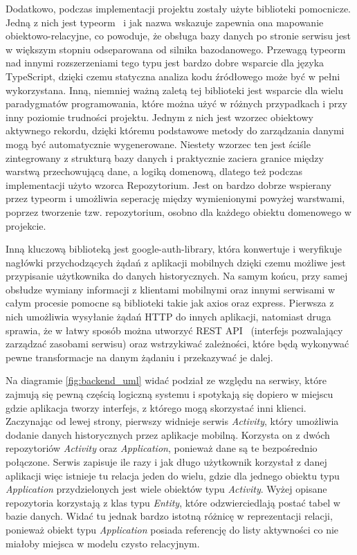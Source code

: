 \documentclass[a4paper,twoside,12pt]{book}
\begin{document}
Dodatkowo, podczas implementacji projektu zostały użyte biblioteki pomocnicze. Jedną z nich jest typeorm~\cite{typeorm} i jak nazwa wskazuje zapewnia ona mapowanie obiektowo-relacyjne, co powoduje, że obsługa bazy danych po stronie serwisu jest w większym stopniu odseparowana od silnika bazodanowego. Przewagą typeorm nad innymi rozszerzeniami tego typu jest bardzo dobre wsparcie dla języka TypeScript, dzięki czemu statyczna analiza kodu źródłowego może być w pełni wykorzystana. Inną, niemniej ważną zaletą tej biblioteki jest wsparcie dla wielu paradygmatów programowania, które można użyć w różnych przypadkach i przy inny poziomie trudności projektu. Jednym z nich jest wzorzec obiektowy aktywnego rekordu, dzięki któremu podstawowe metody do zarządzania danymi mogą być automatycznie wygenerowane. Niestety wzorzec ten jest ściśle zintegrowany z strukturą bazy danych i praktycznie zaciera granice między warstwą przechowującą dane, a logiką domenową, dlatego też podczas implementacji użyto wzorca Repozytorium. Jest on bardzo dobrze wspierany przez typeorm i umożliwia seperację między wymienionymi powyżej warstwami, poprzez tworzenie tzw. repozytorium, osobno dla każdego obiektu domenowego w projekcie.

Inną kluczową biblioteką jest google-auth-library, która konwertuje i weryfikuje nagłówki przychodzących żądań z aplikacji mobilnych dzięki czemu możliwe jest przypisanie użytkownika do danych historycznych. Na samym końcu, przy samej obsłudze wymiany informacji z klientami mobilnymi oraz innymi serwisami w całym procesie pomocne są biblioteki takie jak axios oraz express. Pierwsza z nich umożliwia wysyłanie żądań HTTP do innych aplikacji, natomiast druga sprawia, że w łatwy sposób można utworzyć REST API~\cite{restapi} (interfejs pozwalający zarządzać zasobami serwisu) oraz wstrzykiwać zależności, które będą wykonywać pewne transformacje na danym żądaniu i przekazywać je dalej. 

Na diagramie \ref{fig:backend_uml} widać podział ze względu na serwisy, które zajmują się pewną częścią logiczną systemu i spotykają się dopiero w miejscu gdzie aplikacja tworzy interfejs, z którego mogą skorzystać inni klienci. Zaczynając od lewej strony, pierwszy widnieje serwis \textit{Activity}, który umożliwia dodanie danych historycznych przez aplikacje mobilną. Korzysta on z dwóch repozytoriów \textit{Activity} oraz \textit{Application}, ponieważ dane są te bezpośrednio połączone. Serwis zapisuje ile razy i jak długo użytkownik korzystał z danej aplikacji więc istnieje tu relacja jeden do wielu, gdzie dla jednego obiektu typu \textit{Application} przydzielonych jest wiele obiektów typu \textit{Activity}. Wyżej opisane repozytoria korzystają z klas typu \textit{Entity}, które odzwierciedlają postać tabel w bazie danych. Widać tu jednak bardzo istotną różnicę w reprezentacji relacji, ponieważ obiekt typu \textit{Application} posiada referencję do listy aktywności co nie miałoby miejsca w modelu czysto relacyjnym. 
\end{document}
